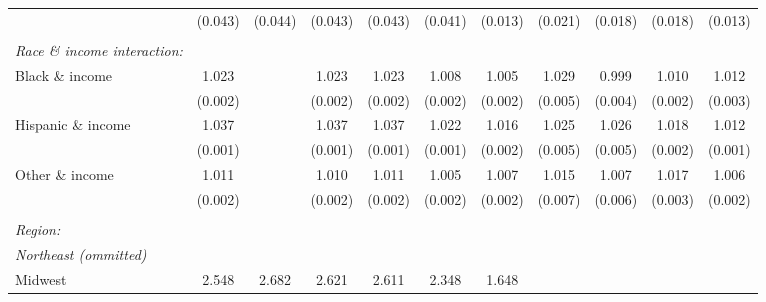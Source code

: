 {\begin{tabular}{l*{10}{c}}
                    &     (0.043)         &     (0.044)         &     (0.043)         &     (0.043)         &     (0.041)         &     (0.013)         &     (0.021)         &     (0.018)         &     (0.018)         &     (0.013)         \\
& & & & & \\ 
 \emph{Race \& income interaction:} & & & & & \\ 
Black \& income     &       1.023\sym{***}&                     &       1.023\sym{***}&       1.023\sym{***}&       1.008\sym{***}&       1.005\sym{*}  &       1.029\sym{***}&       0.999         &       1.010\sym{***}&       1.012\sym{***}\\
                    &     (0.002)         &                     &     (0.002)         &     (0.002)         &     (0.002)         &     (0.002)         &     (0.005)         &     (0.004)         &     (0.002)         &     (0.003)         \\
Hispanic \& income  &       1.037\sym{***}&                     &       1.037\sym{***}&       1.037\sym{***}&       1.022\sym{***}&       1.016\sym{***}&       1.025\sym{***}&       1.026\sym{***}&       1.018\sym{***}&       1.012\sym{***}\\
                    &     (0.001)         &                     &     (0.001)         &     (0.001)         &     (0.001)         &     (0.002)         &     (0.005)         &     (0.005)         &     (0.002)         &     (0.001)         \\
Other \& income     &       1.011\sym{***}&                     &       1.010\sym{***}&       1.011\sym{***}&       1.005\sym{*}  &       1.007\sym{***}&       1.015\sym{*}  &       1.007         &       1.017\sym{***}&       1.006\sym{***}\\
                    &     (0.002)         &                     &     (0.002)         &     (0.002)         &     (0.002)         &     (0.002)         &     (0.007)         &     (0.006)         &     (0.003)         &     (0.002)         \\
& & & & & \\ 
 \emph{Region:} & & & & & \\ 
 \emph{Northeast (ommitted)} & & & & & \\ 
Midwest             &       2.548\sym{***}&       2.682\sym{***}&       2.621\sym{***}&       2.611\sym{***}&       2.348\sym{***}&       1.648\sym{***}&                     &                     &                     &                     \\

\end{tabular}}
